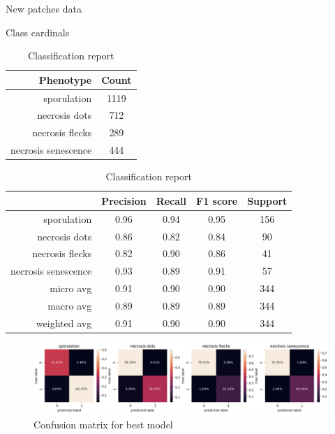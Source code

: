 \documentclass[english]{article}
\begin{document}
\begin{table}[H]
	\caption{New patches data}
	\begin{minipage}{0.4\linewidth}
		\centering
		\caption{Class cardinals}\label{tab:imprpatchersclassdistribution}
		\begin{tabular}{rc}
			\toprule
			Phenotype           & Count \\
			\midrule
			sporulation         & 1119  \\
			necrosis dots       & 712   \\
			necrosis flecks     & 289   \\
			necrosis senescence & 444   \\
			\bottomrule
		\end{tabular}
	\end{minipage}%
	\begin{minipage}{0.4\linewidth}
		\centering
		\caption{Classification report}\label{tab:imprpatches4phenotypes}
		\begin{tabular}{rcccc}
			\toprule
			{}                  & Precision & Recall & F1 score & Support \\
			\midrule
			sporulation         & 0.96      & 0.94   & 0.95     & 156     \\
			necrosis dots       & 0.86      & 0.82   & 0.84     & 90      \\
			necrosis flecks     & 0.82      & 0.90   & 0.86     & 41      \\
			necrosis senescence & 0.93      & 0.89   & 0.91     & 57      \\
			micro avg           & 0.91      & 0.90   & 0.90     & 344     \\
			macro avg           & 0.89      & 0.89   & 0.89     & 344     \\
			weighted avg        & 0.91      & 0.90   & 0.90     & 344     \\
			\bottomrule
		\end{tabular}
	\end{minipage}
\end{table}

\begin{figure}[H]
	\centering
	\includegraphics[width=0.8\linewidth]{p_viticola/2023_cdt_best_model_cm.png}
	\caption{Confusion matrix for best model}\label{fig:cmbestmodel}
\end{figure}
\end{document}
